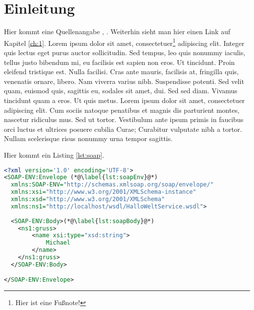 \chapter{Einleitung}

Hier kommt eine Quellenangabe \cite{Gray1981}, \cite{Cerami2002}. Weiterhin sieht man hier einen Link auf Kapitel \ref{ch:1}. Lorem ipsum dolor sit amet, consectetuer\footnote{Hier ist eine Fußnote!} adipiscing elit. Integer quis lectus eget purus auctor sollicitudin. Sed tempus, leo quis nonummy iaculis, tellus justo bibendum mi, eu facilisis est sapien non eros. Ut tincidunt. Proin eleifend tristique est. Nulla facilisi. Cras ante mauris, facilisis at, fringilla quis, venenatis ornare, libero. Nam viverra varius nibh. Suspendisse potenti. Sed velit quam, euismod quis, sagittis eu, sodales sit amet, dui. Sed sed diam. Vivamus tincidunt quam a eros. Ut quis metus. Lorem ipsum dolor sit amet, consectetuer adipiscing elit. Cum sociis natoque penatibus et magnis dis parturient montes, nascetur ridiculus mus. Sed ut tortor. Vestibulum ante ipsum primis in faucibus orci luctus et ultrices posuere cubilia Curae; Curabitur vulputate nibh a tortor. Nullam scelerisque risus nonummy urna tempor sagittis.

\noindent Hier kommt ein Listing \ref{lst:soap}.

\begin{center}
\begin{lstlisting}[caption={SOAP Anfrage an einen HalloWelt-Web-Service},label=lst:soap,language=XML,label={lst:soap}]
<?xml version='1.0' encoding='UTF-8'>
<SOAP-ENV:Envelope (*@\label{lst:soapEnv}@*)
  xmlns:SOAP-ENV="http://schemas.xmlsoap.org/soap/envelope/"
  xmlns:xsi="http://www.w3.org/2001/XMLSchema-instance"
  xmlns:xsd="http://www.w3.org/2001/XMLSchema"
  xmlns:ns1="http://localhost/wsdl/HalloWeltService.wsdl">
  
  <SOAP-ENV:Body>(*@\label{lst:soapBody}@*)
  	<ns1:gruss>
  		<name xsi:type="xsd:string">
  			Michael
  		</name>
  	</ns1:gruss>
  </SOAP-ENV:Body>

</SOAP-ENV:Envelope>
\end{lstlisting}
\end{center}


